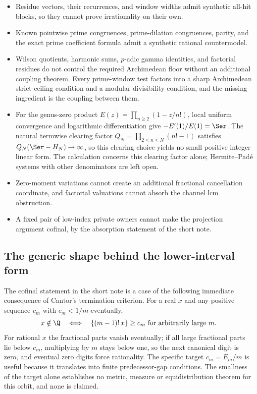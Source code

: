 \begin{itemize}
\item Residue vectors, their recurrences, and window widths admit synthetic
  all-hit blocks, so they cannot prove irrationality on their own.
\item Known pointwise prime congruences, prime-dilation congruences, parity,
  and the exact prime coefficient formula admit a synthetic rational
  countermodel.
\item Wilson quotients, harmonic sums, $p$-adic gamma identities, and
  factorial residues do not control the required Archimedean floor without an
  additional coupling theorem.  Every prime-window test factors into a sharp
  Archimedean strict-ceiling condition and a modular divisibility condition,
  and the missing ingredient is the coupling between them.
\item For the genus-zero product $E(z)=\prod_{n\ge2}(1-z/n!)$, local uniform
  convergence and logarithmic differentiation give $-E'(1)/E(1)=\Ser$.  The
  natural termwise clearing factor $Q_N=\prod_{2\le n\le N}(n!-1)$ satisfies
  $Q_N(\Ser-H_N)\to\infty$, so this clearing choice yields no small positive
  integer linear form.  The calculation concerns this clearing factor alone;
  Hermite--Pad\'e systems with other denominators are left open.
\item Zero-moment variations cannot create an additional fractional
  cancellation coordinate, and factorial valuations cannot absorb the channel
  lcm obstruction.
\item A fixed pair of low-index private owners cannot make the projection
  argument cofinal, by the absorption statement of the short note.
\end{itemize}

\subsection{The generic shape behind the lower-interval form}
\label{long68:sec:ext-generic}

The cofinal statement in the short note is a case of the following immediate
consequence of Cantor's termination criterion.  For a real
$x$ and any positive sequence $c_m$ with $c_m<1/m$ eventually,
\[
 x\notin\Q
 \quad\Longleftrightarrow\quad
 \{(m-1)!\,x\}\ge c_m\ \hbox{for arbitrarily large }m .
\]
For rational $x$ the fractional parts vanish eventually; if all large
fractional parts lie below $c_m$, multiplying by $m$ stays below one, so the
next canonical digit is zero, and eventual zero digits force rationality.
The specific target $c_m=E_m/m$ is useful because it translates into finite
predecessor-gap conditions.  The smallness of the target alone establishes no
metric, measure or equidistribution theorem for this orbit, and none is
claimed.
